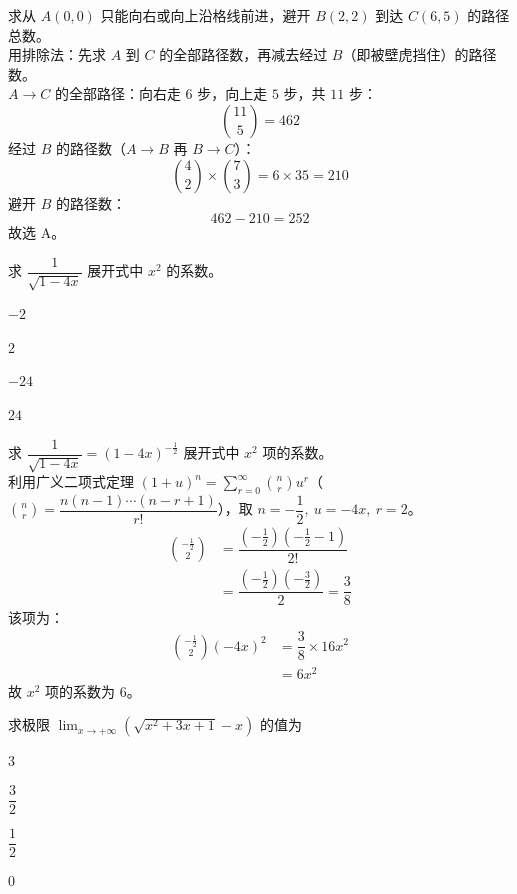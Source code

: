 \documentclass[12pt,a4paper]{exam-zh}
\begin{document}
\begin{solution}
    求从 $A(0,0)$ 只能向右或向上沿格线前进，避开 $B(2,2)$ 到达 $C(6,5)$ 的路径总数。\\
    用排除法：先求 $A$ 到 $C$ 的全部路径数，再减去经过 $B$（即被壁虎挡住）的路径数。\\
    $A\to C$ 的全部路径：向右走 $6$ 步，向上走 $5$ 步，共 $11$ 步：
    \[
        \binom{11}{5} = 462
    \]
    经过 $B$ 的路径数（$A\to B$ 再 $B\to C$）：
    \[
        \binom{4}{2}\times\binom{7}{3} = 6\times35 = 210
    \]
    避开 $B$ 的路径数：
    \[
        462-210 = 252
    \]
    故选 A。
\end{solution}

\begin{question}
    求 $\dfrac{1}{\sqrt{1-4x}}$ 展开式中 $x^2$ 的系数。 \paren[D]
    \begin{choices}
        \item $-2$
        \item $2$
        \item $-24$
        \item $24$
    \end{choices}
\end{question}

\begin{solution}
    求 $\dfrac{1}{\sqrt{1-4x}}=(1-4x)^{-\frac12}$ 展开式中 $x^2$ 项的系数。\\
    利用广义二项式定理 $(1+u)^n=\displaystyle\sum_{r=0}^{\infty}\binom{n}{r}u^r$（$\binom{n}{r}=\dfrac{n(n-1)\cdots(n-r+1)}{r!}$），取 $n=-\dfrac12,\ u=-4x,\ r=2$。
    \begin{align*}
        \binom{-\frac12}{2} &= \dfrac{\left(-\frac12\right)\left(-\frac12-1\right)}{2!} \\
        &= \dfrac{\left(-\frac12\right)\left(-\frac32\right)}{2} = \dfrac38
    \end{align*}
    该项为：
    \begin{align*}
        \binom{-\frac12}{2}(-4x)^2 &= \dfrac38\times16x^2 \\
        &= 6x^2
    \end{align*}
    故 $x^2$ 项的系数为 $6$。
\end{solution}

\begin{question}
    求极限 $\displaystyle\lim_{x\to+\infty}\left(\sqrt{x^2+3x+1}-x\right)$ 的值为 \paren[B]
    \begin{choices}
        \item $3$
        \item $\dfrac{3}{2}$
        \item $\dfrac{1}{2}$
        \item $0$
    \end{choices}
\end{question}
\end{document}
